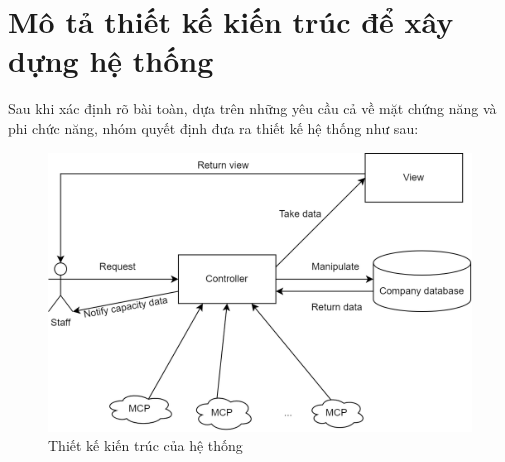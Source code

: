 \section{Mô tả thiết kế kiến trúc để xây dựng hệ thống}
    \quad Sau khi xác định rõ bài toàn, dựa trên những yêu cầu cả về mặt chứng năng và phi chức năng, nhóm quyết định đưa ra thiết kế hệ thống như sau:

    \vspace{1cm}
    \begin{figure}[h]
    	\centering
    	\includegraphics[width=1\linewidth]{imgs/architecture design.png}
    	\caption{Thiết kế kiến trúc của hệ thống}
    \end{figure}

